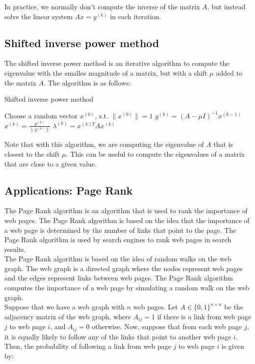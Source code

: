 In practice, we normally don't compute the inverse of the matrix $A$, but instead solve the linear system $A x = y^{(k)}$ in each
iteration.

\subsection{Shifted inverse power method}

The shifted inverse power method is an iterative algorithm to compute the eigenvalue with the smalles magnitude of a matrix, but
with a shift $\mu$ added to the matrix $A$. The algorithm is as follows:

\begin{algorithm}[H]
    \caption{Shifted inverse power method}
    \begin{algorithmic}[1]
        \State Choose a random vector $x^{(0)}$, s.t. $\|x^{(0)}\| = 1$
            \State $y^{(k)} = (A - \mu I)^{-1} x^{(k-1)}$
            \State $x^{(k)} = \frac{y^{(k)}}{\|y^{(k)}\|}$
            \State $\lambda^{(k)} = x^{(k)T} A x^{(k)}$
        \EndFor
    \end{algorithmic}
\end{algorithm}

Note that with this algorithm, we are computing the eigenvalue of $A$ that is closest to the shift $\mu$. This can be useful
to compute the eigenvalues of a matrix that are close to a given value.

\subsection{Applications: Page Rank}

The Page Rank algorithm is an algorithm that is used to rank the importance of web pages. The Page Rank algorithm
is based on the idea that the importance of a web page is determined by the number of links that point to the page.
The Page Rank algorithm is used by search engines to rank web pages in search results.\\

The Page Rank algorithm is based on the idea of random walks on the web graph. The web graph is a directed graph
where the nodes represent web pages and the edges represent links between web pages. The Page Rank algorithm
computes the importance of a web page by simulating a random walk on the web graph.\\

Suppose that we have a web graph with $n$ web pages. Let $A \in \{0, 1\}^{n \times n}$ be the adjacency matrix of the
web graph, where $A_{ij} = 1$ if there is a link from web page $j$ to web page $i$, and $A_{ij} = 0$ otherwise. Now,
suppose that from each web page $j$, it is equally likely to follow any of the links that point to another web page $i$.
Then, the probability of following a link from web page $j$ to web page $i$ is given by:

